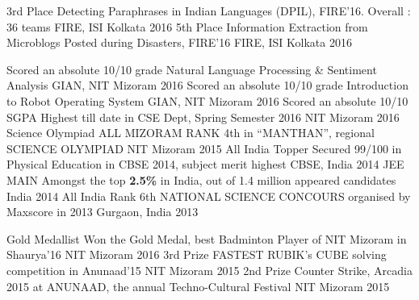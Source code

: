 \begin{cvhonors}
 \cvhonor
  {3rd Place}
  {Detecting Paraphrases in Indian Languages (DPIL), FIRE'16. Overall : 36 teams}
  {FIRE, ISI Kolkata}
  {2016}
 \cvhonor
  {5th Place}
  {Information Extraction from Microblogs Posted during Disasters, FIRE'16}
  {FIRE, ISI Kolkata}
  {2016}
\end{cvhonors}
\begin{cvhonors}
  \cvhonor
    {Scored an absolute 10/10 grade }
    {Natural Language Processing \& Sentiment Analysis}
    {GIAN, NIT Mizoram}
    {2016}
  \cvhonor
    {Scored an absolute 10/10 grade }
    {Introduction to Robot Operating System}
    {GIAN, NIT Mizoram}
    {2016}
  \cvhonor
    {Scored an absolute 10/10 SGPA}
    {Highest till date in CSE Dept, Spring Semester 2016}
    {NIT Mizoram}
    {2016}
  \cvhonor
    {Science Olympiad}
    {ALL MIZORAM RANK 4th in “MANTHAN”, regional SCIENCE OLYMPIAD}
    {NIT Mizoram}
    {2015}
  \cvhonor
    {All India Topper}
    {Secured 99/100 in Physical Education in CBSE 2014, subject merit highest}
    {CBSE, India}
    {2014}
  \cvhonor
    {JEE MAIN}
    {Amongst the top \textbf{2.5\%} in India, out of 1.4 million appeared candidates}
    {India}
    {2014}
  \cvhonor
    {All India Rank 6th}
    {NATIONAL SCIENCE CONCOURS organised by Maxscore in 2013}
    {Gurgaon, India}
    {2013}
\end{cvhonors}

\begin{cvhonors}
  \cvhonor
    {Gold Medallist}
    {Won the Gold Medal, best Badminton Player of NIT Mizoram in Shaurya'16}
    {NIT Mizoram}
    {2016}
  \cvhonor
    {3rd Prize}
    {FASTEST RUBIK’s CUBE solving competition in Anunaad'15 }
    {NIT Mizoram}
    {2015}
  \cvhonor
    {2nd Prize}
    {Counter Strike, Arcadia 2015 at ANUNAAD, the annual Techno-Cultural Festival}
    {NIT Mizoram}
    {2015}
\end{cvhonors}
